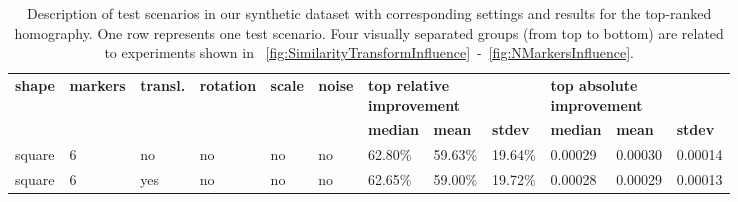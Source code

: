 \def\tblsccolw{0.06}
\def\tblrscolw{0.08}
\begin{table}[t]
    \caption[Description of syntehtic dataset scenarios]{Description of test scenarios in our synthetic dataset with corresponding settings and results for the top-ranked homography. One row represents one test scenario. Four visually separated groups (from top to bottom) are related to experiments shown in \figstr{}~\ref{fig:SimilarityTransformInfluence}~-~\ref{fig:NMarkersInfluence}.}
    \label{tab:TestScenariosResults}
    \setlength{\tabcolsep}{3pt}
    \begin{center}
        \footnotesize
        \begin{tabular}{p{\tblsccolw\linewidth}p{\tblsccolw\linewidth}p{\tblsccolw\linewidth}p{\tblsccolw\linewidth}p{\tblsccolw\linewidth}p{\tblsccolw\linewidth}|p{\tblrscolw\linewidth}p{\tblrscolw\linewidth}p{\tblrscolw\linewidth}p{\tblrscolw\linewidth}p{\tblrscolw\linewidth}p{\tblrscolw\linewidth}}
            \toprule
            \multirow{2}{2pt}{\textbf{shape}}    &
            \multirow{2}{2pt}{\textbf{markers}}  &
            \multirow{2}{2pt}{\textbf{transl.}}  &
            \multirow{2}{2pt}{\textbf{rotation}} &
            \multirow{2}{2pt}{\textbf{scale}}    &
            \multirow{2}{2pt}{\textbf{noise}}    & \multicolumn{3}{l}{\textbf{top relative improvement}} & \multicolumn{3}{l}{\textbf{top absolute improvement}}                                                                                                         \\
                                                 &                                                       &                                                       &     &     &     & \textbf{median} & \textbf{mean} & \textbf{stdev} &
            \textbf{median}                      & \textbf{mean}                                         & \textbf{stdev}                                                                                                                                                \\
            \midrule
            square                               & 6                                                     & no                                                    & no  & no  & no  & 62.80\%         & 59.63\%       & 19.64\%        & 0.00029  & 0.00030   & 0.00014   \\
            square                               & 6                                                     & yes                                                   & no  & no  & no  & 62.65\%         & 59.00\%       & 19.72\%        & 0.00028  & 0.00029   & 0.00013   \\

\end{tabular}
\end{center}
\end{table}
